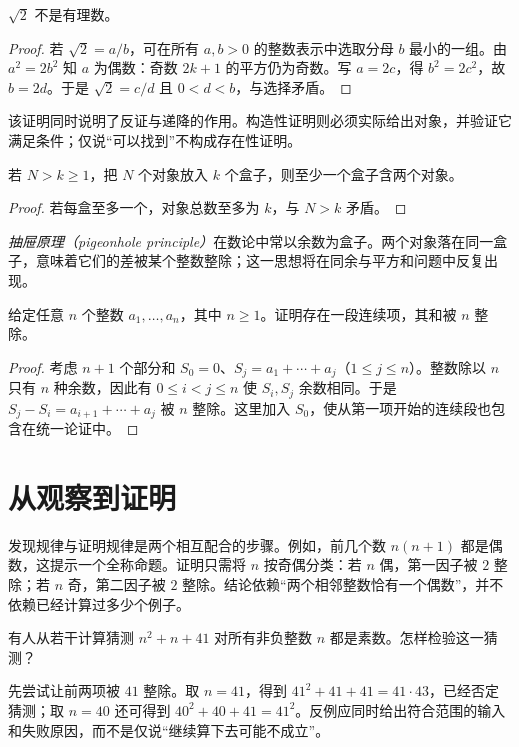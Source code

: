 \begin{example}
$\sqrt2$ 不是有理数。
\end{example}
\begin{proof}
若 $\sqrt2=a/b$，可在所有 $a,b>0$ 的整数表示中选取分母 $b$ 最小的一组。由 $a^2=2b^2$ 知 $a$ 为偶数：奇数 $2k+1$ 的平方仍为奇数。写 $a=2c$，得 $b^2=2c^2$，故 $b=2d$。于是 $\sqrt2=c/d$ 且 $0<d<b$，与选择矛盾。
\end{proof}

该证明同时说明了反证与递降的作用。构造性证明则必须实际给出对象，并验证它满足条件；仅说“可以找到”不构成存在性证明。

\begin{proposition}[抽屉原理]
若 $N>k\ge1$，把 $N$ 个对象放入 $k$ 个盒子，则至少一个盒子含两个对象。
\end{proposition}
\begin{proof}
若每盒至多一个，对象总数至多为 $k$，与 $N>k$ 矛盾。
\end{proof}

\emph{抽屉原理（pigeonhole principle）}在数论中常以余数为盒子。两个对象落在同一盒子，意味着它们的差被某个整数整除；这一思想将在同余与平方和问题中反复出现。

\begin{example}[从部分和中寻找整除关系]
给定任意 $n$ 个整数 $a_1,\ldots,a_n$，其中 $n\ge1$。证明存在一段连续项，其和被 $n$ 整除。
\end{example}
\begin{proof}
考虑 $n+1$ 个部分和 $S_0=0$、$S_j=a_1+\cdots+a_j$（$1\le j\le n$）。整数除以 $n$ 只有 $n$ 种余数，因此有 $0\le i<j\le n$ 使 $S_i,S_j$ 余数相同。于是 $S_j-S_i=a_{i+1}+\cdots+a_j$ 被 $n$ 整除。这里加入 $S_0$，使从第一项开始的连续段也包含在统一论证中。
\end{proof}

\section{从观察到证明}

发现规律与证明规律是两个相互配合的步骤。例如，前几个数 $n(n+1)$ 都是偶数，这提示一个全称命题。证明只需将 $n$ 按奇偶分类：若 $n$ 偶，第一因子被 $2$ 整除；若 $n$ 奇，第二因子被 $2$ 整除。结论依赖“两个相邻整数恰有一个偶数”，并不依赖已经计算过多少个例子。

\begin{example}[计算很多项仍不能替代证明]
有人从若干计算猜测 $n^2+n+41$ 对所有非负整数 $n$ 都是素数。怎样检验这一猜测？
\end{example}
\begin{solve}
先尝试让前两项被 $41$ 整除。取 $n=41$，得到 $41^2+41+41=41\cdot43$，已经否定猜测；取 $n=40$ 还可得到 $40^2+40+41=41^2$。反例应同时给出符合范围的输入和失败原因，而不是仅说“继续算下去可能不成立”。
\end{solve}

